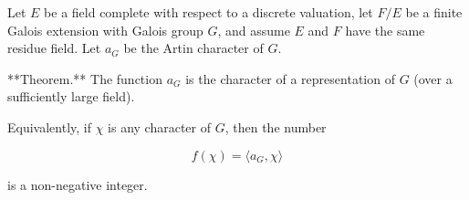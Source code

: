 Let $E$ be a field complete with respect to a discrete valuation, let $F/E$ be a finite Galois extension with Galois group $G$, and assume $E$ and $F$ have the same residue field. Let $a_G$ be the Artin character of $G$.

**Theorem.** The function $a_G$ is the character of a representation of $G$ (over a sufficiently large field).

Equivalently, if $\chi$ is any character of $G$, then the number

$$f(\chi) = \langle a_G, \chi \rangle$$

is a non-negative integer.

